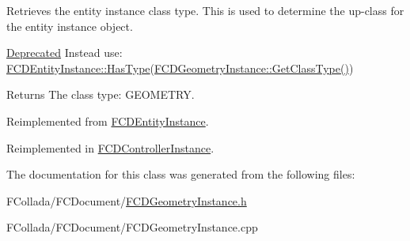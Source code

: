 \label{classFCDGeometryInstance_a6125c229bbac52a27ae4a1fa8cd0dac6}
Retrieves the entity instance class type. This is used to determine the up-\/class for the entity instance object. \begin{Desc}
\item[\hyperlink{deprecated__deprecated000005}{Deprecated}]Instead use: \hyperlink{classFUObject_ab838ad4132b756dcd3614440b8e32f2a}{FCDEntityInstance::HasType}(\hyperlink{classFUObject_a907d4f6d284b3ac4f8203d557af41668}{FCDGeometryInstance::GetClassType()}) \end{Desc}
\begin{DoxyReturn}{Returns}
The class type: GEOMETRY. 
\end{DoxyReturn}


Reimplemented from \hyperlink{classFCDEntityInstance_a773c2cfdbad937e93da7a3fa71a671a7}{FCDEntityInstance}.



Reimplemented in \hyperlink{classFCDControllerInstance_a5c8057a1560e6b77340218e5d1e0d4ef}{FCDControllerInstance}.



The documentation for this class was generated from the following files:\begin{DoxyCompactItemize}
\item 
FCollada/FCDocument/\hyperlink{FCDGeometryInstance_8h}{FCDGeometryInstance.h}\item 
FCollada/FCDocument/FCDGeometryInstance.cpp\end{DoxyCompactItemize}
